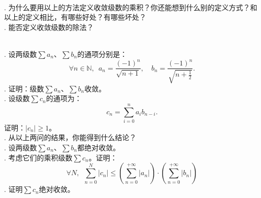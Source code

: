 \documentclass[12pt,UTF8,fontset=none]{ctexbook}
\begin{document}


\begin{sk}
    \mbox{} \\
    . 为什么要用以上的方法定义收敛级数的乘积？你还能想到什么别的定义方式？和以上的定义相比，有哪些好处？有哪些坏处？\\
    . 能否定义收敛级数的除法？
\end{sk}

\begin{xt}
    \mbox{} \\
    . 设两级数$\sum a_n$、$\sum b_n$的通项分别是：
    $$ \forall n\in\mathbb{N}, \,\,\, a_n = \frac{(-1)^n}{\sqrt{n+1}}, \quad b_n = \frac{(-1)^n}{\sqrt{n+\frac{1}{2}}}. $$
    . 证明：级数$\sum a_n$、$\sum b_n$收敛。\\
    . 设级数$\sum c_n$的通项为：
    $$ c_n = \sum_{i=0}^n a_i b_{n-i} . $$
    \indent 证明：$|c_n| \geqslant 1$。\\
    . 从以上两问的结果，你能得到什么结论？\\
    . 设两级数$\sum a_n$、$\sum b_n$都绝对收敛。\\
    . 考虑它们的乘积级数$\sum c_n$。证明：
    $$ \forall N, \,\,\, \sum_{n=0}^{N} |c_n| \leqslant \left(\sum_{n=0}^{+\infty} |a_n| \right) \cdot \left(\sum_{n=0}^{+\infty} |b_n| \right)$$
    . 证明$\sum c_n$绝对收敛。
\end{xt}
\end{document}
